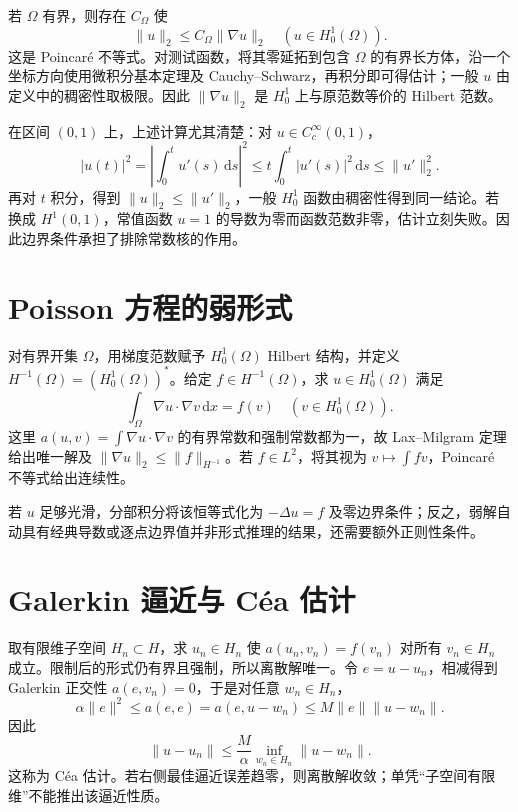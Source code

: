 \documentclass[UTF8,12pt,a4paper,fontset=fandol]{ctexbook}
\begin{document}
若 $\Omega$ 有界，则存在 $C_\Omega$ 使
\begin{equation}
 \|u\|_2\leq C_\Omega\|\nabla u\|_2\quad(u\in H_0^1(\Omega)).
 \label{eq:fa-poincare}
\end{equation}
这是 Poincaré 不等式。对测试函数，将其零延拓到包含 $\Omega$ 的有界长方体，沿一个坐标方向使用微积分基本定理及 Cauchy--Schwarz，再积分即可得估计；一般 $u$ 由定义中的稠密性取极限。因此 $\|\nabla u\|_2$ 是 $H_0^1$ 上与原范数等价的 Hilbert 范数。

在区间 $(0,1)$ 上，上述计算尤其清楚：对 $u\in C_c^\infty(0,1)$，
\[
 |u(t)|^2=\left|\int_0^tu'(s)\,\mathrm ds\right|^2
 \leq t\int_0^t|u'(s)|^2\,\mathrm ds\leq\|u'\|_2^2.
\]
再对 $t$ 积分，得到 $\|u\|_2\leq\|u'\|_2$，一般 $H_0^1$ 函数由稠密性得到同一结论。若换成 $H^1(0,1)$，常值函数 $u=1$ 的导数为零而函数范数非零，估计立刻失败。因此边界条件承担了排除常数核的作用。

\section{Poisson 方程的弱形式}
对有界开集 $\Omega$，用梯度范数赋予 $H_0^1(\Omega)$ Hilbert 结构，并定义 $H^{-1}(\Omega)=(H_0^1(\Omega))^*$。给定 $f\in H^{-1}(\Omega)$，求 $u\in H_0^1(\Omega)$ 满足
\[
 \int_\Omega\nabla u\cdot\nabla v\,\mathrm dx=f(v)
 \quad(v\in H_0^1(\Omega)).
\]
这里 $a(u,v)=\int\nabla u\cdot\nabla v$ 的有界常数和强制常数都为一，故 Lax--Milgram 定理给出唯一解及 $\|\nabla u\|_2\leq\|f\|_{H^{-1}}$。若 $f\in L^2$，将其视为 $v\mapsto\int fv$，Poincaré 不等式给出连续性。

若 $u$ 足够光滑，分部积分将该恒等式化为 $-\Delta u=f$ 及零边界条件；反之，弱解自动具有经典导数或逐点边界值并非形式推理的结果，还需要额外正则性条件。

\section{Galerkin 逼近与 Céa 估计}
取有限维子空间 $H_n\subset H$，求 $u_n\in H_n$ 使 $a(u_n,v_n)=f(v_n)$ 对所有 $v_n\in H_n$ 成立。限制后的形式仍有界且强制，所以离散解唯一。令 $e=u-u_n$，相减得到 Galerkin 正交性 $a(e,v_n)=0$，于是对任意 $w_n\in H_n$，
\[
 \alpha\|e\|^2\leq a(e,e)=a(e,u-w_n)
 \leq M\|e\|\|u-w_n\|.
\]
因此
\begin{equation}
 \|u-u_n\|\leq\frac M\alpha\inf_{w_n\in H_n}\|u-w_n\|.
 \label{eq:fa-cea}
\end{equation}
这称为 Céa 估计。若右侧最佳逼近误差趋零，则离散解收敛；单凭“子空间有限维”不能推出该逼近性质。
\end{document}
